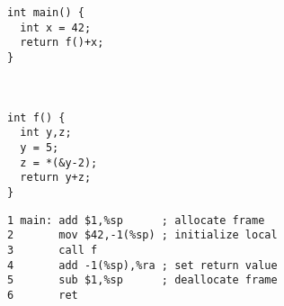 \documentclass[acmsmall,review,anonymous]{acmart}\settopmatter{printfolios=true,printccs=false,printacmref=false}
\begin{document}
\begin{figure}
\begin{subfigure}[t]{.2\textwidth}
{\small
\begin{verbatim}
int main() {
  int x = 42;
  return f()+x;
}



int f() {
  int y,z;
  y = 5;
  z = *(&y-2);
  return y+z;
}
\end{verbatim}
}
\end{subfigure}
\begin{subfigure}[t]{.5\textwidth}
{\small
\begin{verbatim}
1 main: add $1,%sp      ; allocate frame
2       mov $42,-1(%sp) ; initialize local
3       call f
4       add -1(%sp),%ra ; set return value
5       sub $1,%sp      ; deallocate frame
6       ret


\end{verbatim}}
\end{subfigure}
\end{figure}
\end{document}
